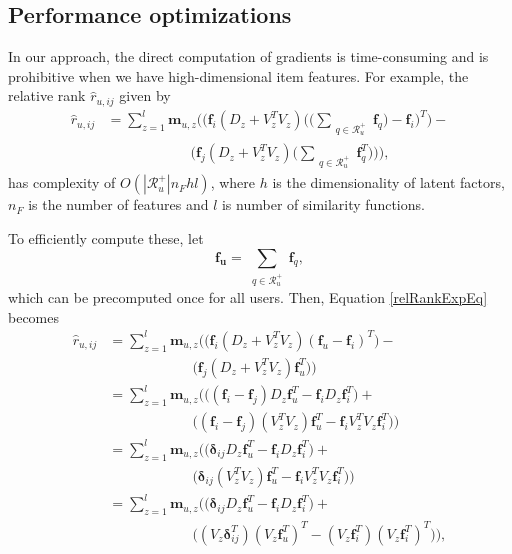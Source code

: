 \subsection {Performance optimizations}

In our approach, the direct computation of gradients is
time-consuming and is prohibitive when we have high-dimensional item
features. For example, the relative rank $\hat{r}_{u,ij}$ given by
\begin{equation}\label{relRankExpEq}
\begin{split}
\hat{r}_{u,ij} &= \sum_{z=1}^l \bm{m}_{u,z} \Bigg(  
\Big(\bm{f}_i (D_z + V_z^TV_z) \Big(\Big(\sum_{\substack{ q \in
\mathcal{R}_u^+ }}\bm{f}_q\Big) - \bm{f}_i\Big)^T \Big) -  \\
&\quad \quad \quad \quad \quad \quad \Big( \bm{f}_j (D_z + V_z^TV_z)
\Big(\sum_{\substack{ q \in \mathcal{R}_u^+}}\bm{f}_q^T\Big) \Big) \Bigg),
\end{split}
\end{equation}
has complexity of $O(|\mathcal{R}_u^+|n_F h l)$, where $h$ is the dimensionality
of latent factors, $n_F$ is the number of features and $l$ is number of similarity
functions.

To efficiently compute these, let 
\begin{equation*}
  \bm{f_u} = \sum_{\substack{ q \in \mathcal{R}_u^+}}\bm{f}_q, 
\end{equation*}
which can be precomputed once for all users.
Then, Equation \ref{relRankExpEq} becomes
\begin{equation*}
\begin{split}
  \hat{r}_{u,ij} &= \sum_{z=1}^l \bm{m}_{u,z}\Bigg(  
   \Big( \bm{f}_i (D_z + V_z^TV_z) (\bm{f}_u - \bm{f}_i)^T \Big) -  \\
  &\quad \quad \quad \quad \quad \quad \Big( \bm{f}_j (D_z + V_z^TV_z)
   \bm{f}_u^T \Big) 
  \Bigg) \\
  &= \sum_{z=1}^l \bm{m}_{u,z}\Bigg(  
   \Big( (\bm{f}_i-\bm{f}_j)D_z\bm{f}_u^T - \bm{f}_iD_z\bm{f}_i^T \Big) +  \\
  &\quad \quad \quad \quad \quad \quad  \Big(
   (\bm{f}_i-\bm{f}_j)(V_z^TV_z)\bm{f}_u^T -
  \bm{f}_iV_z^TV_z\bm{f}_i^T\Big) \Bigg) \\
  &= \sum_{z=1}^l \bm{m}_{u,z}\Bigg(  
   \Big( \bm{\delta}_{ij}D_z\bm{f}_u^T - \bm{f}_iD_z\bm{f}_i^T \Big) +  \\
  &\quad \quad \quad \quad \quad \quad
   \Big(\bm{\delta}_{ij}(V_z^TV_z)\bm{f}_u^T -
  \bm{f}_iV_z^TV_z\bm{f}_i^T\Big) \Bigg) \\
  &= \sum_{z=1}^l \bm{m}_{u,z} \Bigg( 
   \Big( \bm{\delta}_{ij}D_z\bm{f}_u^T - \bm{f}_iD_z\bm{f}_i^T \Big) +  \\
  &\quad \quad \quad \quad \quad \quad
   \Big((V_z\bm{\delta}_{ij}^T)(V_z\bm{f}_u^T)^T -
  (V_z\bm{f}_i^T)(V_z\bm{f}_i^T)^T\Big) \Bigg) ,
\end{split}
\end{equation*}

